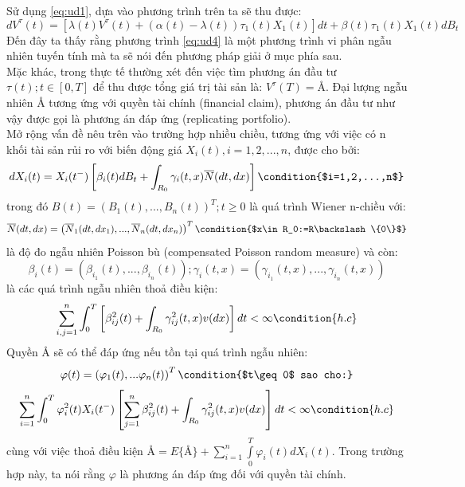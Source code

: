 \documentclass[14pt,a4paper]{article}
\numberwithin{equation}{section}
\begin{document}
Sử dụng \eqref{eq:ud1}, dựa vào phương trình trên ta sẽ thu được:
\begin{equation}\label{eq:ud4}
	dV^\tau(t)=[\lambda(t)V^\tau(t)+(\alpha(t)-\lambda(t))\tau_1(t)X_1(t)]dt +\beta(t)\tau_1(t)X_1(t)dB_t
\end{equation}
Đến đây ta thấy rằng phương trình \eqref{eq:ud4} là một phương trình vi phân ngẫu nhiên tuyến tính mà ta sẽ nói đến phương pháp giải ở mục phía sau.\\
Mặc khác, trong thực tế thường xét đến việc tìm phương án đầu tư $\tau(t);t\in[0,T]$ để thu được tổng giá trị tài sản là: $V^\tau(T)=\text{\AA}$. Đại lượng ngẫu nhiên $\text{\AA}$ tương ứng với quyền tài chính (financial claim), phương án đầu tư như vậy được gọi là phương án đáp ứng (replicating portfolio).\\
Mở rộng vấn đề nêu trên vào trường hợp nhiều chiều, tương ứng với việc có n khối tài sản rủi ro với biến động giá $X_i(t),i=1,2,...,n$, được cho bởi:
\begin{equation}\label{eq:ud5}
	dX_i(t)=X_i(t^-)\left[\beta_i(t)dB_t+\int_{R_0}\gamma_i(t,x)\overline{N}(dt,dx) \right] \condition{$i=1,2,...,n$}
\end{equation}
trong đó $B(t)=(B_1(t),...,B_n(t))^T;t\geq 0$ là quá trình Wiener n-chiều với:
\begin{equation*}
	\overline{N}(dt,dx)=\left(\overline{N}_1(dt,dx_1),...,\overline{N}_n(dt,dx_n)\right)^T \condition{$x\in R_0:=R\backslash\{0\}$}
\end{equation*}
là độ đo ngẫu nhiên Poisson bù (compensated Poisson random measure) và còn:
\begin{equation*}
	\beta_i(t)=(\beta_{i_1}(t),...,\beta_{i_n}(t));\gamma_i(t,x)=(\gamma_{i_1}(t,x),...,\gamma_{i_n}(t,x))
\end{equation*}
là các quá trình ngẫu nhiên thoả điều kiện:
\begin{equation*}
	\sum_{i,j=1}^{n}\int_{0}^{T}\left[\beta_{ij}^2(t)+\int_{R_0}\gamma_{ij}^2(t,x)v(dx) \right]dt<\infty \condition{h.c}
\end{equation*}
Quyền $\text{\AA}$ sẽ có thể đáp ứng nếu tồn tại quá trình ngẫu nhiên:
\begin{equation*}
	\varphi(t)=\left(\varphi_1(t),...\varphi_n(t) \right)^T \condition{$t\geq 0$ sao cho:}\\
\end{equation*}
\begin{equation*}
	\sum_{i=1}^{n}\int_{0}^{T}\varphi_i^2(t)X_i(t^-)\left[\sum_{j=1}^{n}\beta_{ij}^2(t)+\int_{R_0}\gamma_{ij}^2(t,x)v(dx) \right]dt<\infty \condition{h.c}
\end{equation*}
cùng với việc thoả điều kiện $\text{\AA}=E\{\text{\AA}\}+\sum\limits_{i=1}^{n}\int\limits_{0}^{T}\varphi_i(t)dX_i(t)$. Trong trường hợp này, ta nói rằng $\varphi$ là phương án đáp ứng đối với quyền tài chính.\\
\end{document}
